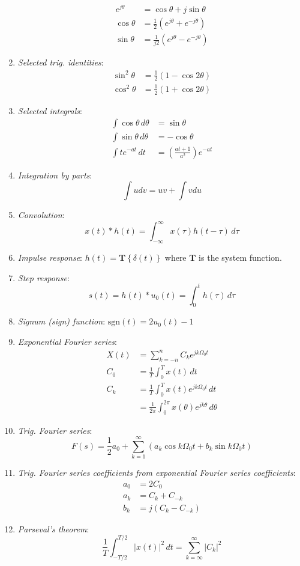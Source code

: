 \begin{multicols}{2}
\begin{enumerate}[label=\roman*]
\begin{align*}
  e^{j\theta} &= \cos{\theta} + j\sin{\theta}\\
  \cos{\theta} &= \frac{1}{2}\left(e^{j\theta}+e^{-j\theta}\right)\\
  \sin{\theta} &= \frac{1}{j2}\left(e^{j\theta}-e^{-j\theta}\right)
\end{align*}
\item \textit{Selected trig. identities}:
\begin{align*}
  \sin^2\theta &= \frac{1}{2}\left(1-\cos{2\theta}\right)\\
  \cos^2\theta &= \frac{1}{2}\left(1+\cos{2\theta}\right)
\end{align*}
\item \textit{Selected integrals}:
\begin{align*}
  \int \cos\theta\,d\theta &= \sin\theta\\
  \int \sin\theta\,d\theta &= - \cos \theta\\
  \int te^{-at}\,dt &= \left(\frac{at + 1}{a^2}\right)e^{-at}
\end{align*}
\item \textit{Integration by parts}:
$$
\int udv = uv + \int vdu
$$
\item \textit{Convolution}:
$$
x(t) * h(t) = \int_{-\infty}^{\infty}x(\tau)h(t - \tau)\,d\tau
$$
\item \textit{Impulse response}: $h(t) = \mathbf{T}\left\{\delta(t)\right\}$ where $\mathbf{T}$ is the system function.
\item \textit{Step response}:
$$
s(t) = h(t)*u_0(t) = \int_0^t h(\tau)\,d\tau
$$
\item \textit{Signum (sign) function}: $\mathrm{sgn}(t) = 2u_0(t) - 1$
\item \textit{Exponential Fourier series}:
\begin{align*}
  X(t) &= \sum_{k = -n}^{n} C_k e^{jk\Omega_0 t}\\
  C_0 &= \frac{1}{T}\int_0^T x(t)\,dt\\
  C_k &= \frac{1}{T}\int_0^T x(t)e^{jk\Omega_0 t}\,dt\\ 
      &= \frac{1}{2\pi}\int_0^{2\pi} x(\theta)e^{jk\theta}\,d\theta
\end{align*}
\item \textit{Trig. Fourier series}:
$$
F(s) = \frac{1}{2}a_0 + \sum_{k=1}^{\infty} \left( a_k \cos k\Omega_0 t + b_k \sin k\Omega_0 t\right)
$$
\item \textit{Trig. Fourier series coefficients from exponential Fourier series coefficients}:
\begin{align*}
  a_0 &= 2C_0\\
  a_k &= C_k + C_{-k}\\
  b_k &= j\left(C_k - C_{-k}\right)
\end{align*}
\item \textit{Parseval's theorem}: 
$$
\frac{1}{T}\int_{-T/2}^{T/2} \left|x(t)\right|^2\, dt = \sum_{k=\infty}^{\infty} \left|C_k\right|^2
$$
\end{enumerate}
\end{multicols}




\endinput










